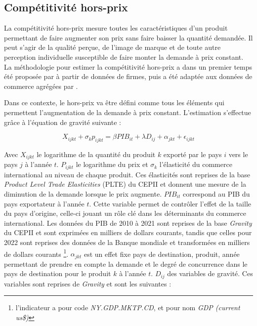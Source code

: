 \documentclass[french,10pt,a4paper]{article}
\begin{document}
\subsection*{Compétitivité hors-prix}

La compétitivité hors-prix mesure toutes les caractéristiques d'un produit permettant de faire augmenter son prix sans faire baisser la quantité demandée. Il peut s'agir de la qualité perçue, de l'image de marque et de toute autre perception individuelle susceptible de faire monter la demande à prix constant. La méthodologie pour estimer la compétitivité hors-prix a dans un premier temps été proposée par \cite{Khandelwal2013} à partir de données de firmes, puis a été adaptée aux données de commerce agrégées par \cite{Bas2015}.

Dans ce contexte, le hors-prix va être défini comme tous les éléments qui permettent l'augmentation de la demande à prix constant. L'estimation s'effectue grâce à l'équation de gravité suivante :

\begin{equation}
\label{eq:2}
X_{ijkt} + \sigma_{k} p_{ijkt}  = \beta PIB_{it} + \lambda D_{ij} + \alpha_{jkt} + \epsilon_{ijkt}
\end{equation}

Avec $X_{ijkt}$ le logarithme de la quantité du produit $k$ exporté par le pays $i$ vers le pays $j$ à l'année $t$. $P_{ijkt}$ le logarithme du prix et $\sigma_{k}$ l'élasticité du commerce international au niveau de chaque produit. Ces élasticités sont reprises de la base \textit{Product Level Trade Elasticities} (PLTE) du CEPII \citep{Fontagne2019} et donnent une mesure de la diminution de la demande lorsque le prix augmente. $PIB_{it}$ correspond au PIB du pays exportateur à l'année $t$. Cette variable permet de contrôler l'effet de la taille du pays d'origine, celle-ci jouant un rôle clé dans les déterminants du commerce international. Les données du PIB de 2010 à 2021 sont reprises de la base \textit{Gravity} du CEPII \citep{Conte2022} et sont exprimées en milliers de dollars courants, tandis que celles pour 2022 sont reprises des données de la Banque mondiale et transformées en milliers de dollars courants \footnote{l'indicateur a pour code \textit{NY.GDP.MKTP.CD}, et pour nom \textit{GDP (current us\$)}}. $\alpha_{jkt}$ est un effet fixe pays de destination, produit, année permettant de prendre en compte la demande et le degré de concurrence dans le pays de destination pour le produit $k$ à l'année $t$. $D_{ij}$ des variables de gravité. Ces variables sont reprises de \textit{Gravity} et sont les suivantes :
\end{document}
